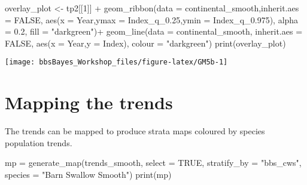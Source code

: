 \documentclass[
]{book}
\newenvironment{Shaded}{\begin{snugshade}}{\end{snugshade}}
\newcommand{\AttributeTok}[1]{\textcolor[rgb]{0.77,0.63,0.00}{#1}}
\newcommand{\ConstantTok}[1]{\textcolor[rgb]{0.00,0.00,0.00}{#1}}
\newcommand{\DecValTok}[1]{\textcolor[rgb]{0.00,0.00,0.81}{#1}}
\newcommand{\FloatTok}[1]{\textcolor[rgb]{0.00,0.00,0.81}{#1}}
\newcommand{\FunctionTok}[1]{\textcolor[rgb]{0.00,0.00,0.00}{#1}}
\newcommand{\NormalTok}[1]{#1}
\newcommand{\OtherTok}[1]{\textcolor[rgb]{0.56,0.35,0.01}{#1}}
\newcommand{\SpecialCharTok}[1]{\textcolor[rgb]{0.00,0.00,0.00}{#1}}
\newcommand{\StringTok}[1]{\textcolor[rgb]{0.31,0.60,0.02}{#1}}
\begin{document}
\begin{Shaded}
\begin{Highlighting}[]

\NormalTok{overlay\_plot }\OtherTok{\textless{}{-}}\NormalTok{ tp2[[}\DecValTok{1}\NormalTok{]] }\SpecialCharTok{+}
  \FunctionTok{geom\_ribbon}\NormalTok{(}\AttributeTok{data =}\NormalTok{ continental\_smooth,}\AttributeTok{inherit.aes =} \ConstantTok{FALSE}\NormalTok{,}
              \FunctionTok{aes}\NormalTok{(}\AttributeTok{x =}\NormalTok{ Year,}\AttributeTok{ymax =}\NormalTok{ Index\_q\_0}\FloatTok{.25}\NormalTok{,}\AttributeTok{ymin =}\NormalTok{ Index\_q\_0}\FloatTok{.975}\NormalTok{),}
              \AttributeTok{alpha =} \FloatTok{0.2}\NormalTok{,}
              \AttributeTok{fill =} \StringTok{"darkgreen"}\NormalTok{)}\SpecialCharTok{+}
  \FunctionTok{geom\_line}\NormalTok{(}\AttributeTok{data =}\NormalTok{ continental\_smooth, }\AttributeTok{inherit.aes =} \ConstantTok{FALSE}\NormalTok{,}
            \FunctionTok{aes}\NormalTok{(}\AttributeTok{x =}\NormalTok{ Year,}\AttributeTok{y =}\NormalTok{ Index),}
            \AttributeTok{colour =} \StringTok{"darkgreen"}\NormalTok{)}
\FunctionTok{print}\NormalTok{(overlay\_plot)}
\end{Highlighting}
\end{Shaded}

\begin{center}\texttt{[image: bbsBayes\_Workshop\_files/figure-latex/GM5b-1]} \end{center}

\hypertarget{mapping-the-trends}{%
\section{Mapping the trends}\label{mapping-the-trends}}

The trends can be mapped to produce strata maps coloured by species population trends.

\begin{Shaded}
\begin{Highlighting}[]
\NormalTok{mp }\OtherTok{=} \FunctionTok{generate\_map}\NormalTok{(trends\_smooth,}
                  \AttributeTok{select =} \ConstantTok{TRUE}\NormalTok{,}
                  \AttributeTok{stratify\_by =} \StringTok{"bbs\_cws"}\NormalTok{,}
                  \AttributeTok{species =} \StringTok{"Barn Swallow Smooth"}\NormalTok{)}
\FunctionTok{print}\NormalTok{(mp)}
\end{Highlighting}
\end{Shaded}
\end{document}
